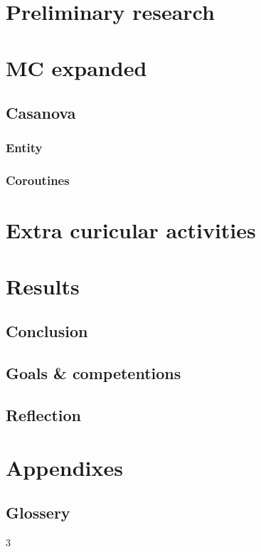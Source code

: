 \begin{multicols}{3}

% 

\part{Preliminary research}



\part{MC expanded}\label{part:mcexpanded}





\chapter{Casanova}
\section{Entity}
\section{Coroutines}



\part{Extra curicular activities}



\part{Results}

\chapter{Conclusion}
\chapter{Goals \& competentions}
\chapter{Reflection}



\part{Appendixes}
\chapter{Glossery}

% 
% 

\end{multicols}{3}

